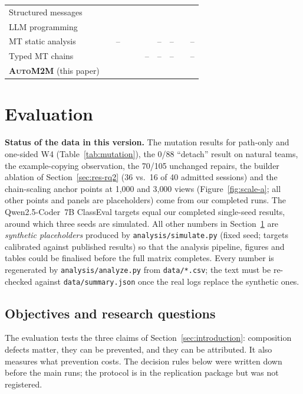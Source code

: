 \documentclass[pdflatex,sn-mathphys-num]{sn-jnl}
\theoremstyle{thmstyleone}%
\theoremstyle{thmstyletwo}%
\theoremstyle{thmstylethree}%
\newcommand{\auto}{\textsc{AutoM2M}}
\newcommand{\W}[1]{\textsf{W#1}}
\newcommand{\cmark}{\ding{51}}
\newcommand{\xmark}{\ding{55}}
\newcommand{\pmark}{\ding{109}}
\newcommand{\SyntheticNotice}{%
\begin{tcolorbox}[enhanced, breakable, colback=rawbg, colframe=rawbar, boxrule=0.6pt, arc=1pt,
  left=6pt, right=6pt, top=4pt, bottom=4pt]
\small\textbf{Status of the data in this version.} The mutation results for
path-only and one-sided \W{4} (Table~\ref{tab:mutation}), the 0/88 ``detach''
result on natural teams, the example-copying observation, the 70/105 unchanged
repairs, the builder ablation of Section~\ref{sec:res-rq2} (36 vs.\ 16 of 40 admitted sessions) and the chain-scaling anchor points at 1{,}000 and 3{,}000 views
(Figure~\ref{fig:scale-a}; all other points and panels are placeholders) come
from our completed runs. The Qwen2.5-Coder~7B ClassEval targets equal our completed
single-seed results, around which three seeds are simulated. All other numbers in
Section~\ref{sec:eval} are \emph{synthetic placeholders} produced by
\texttt{analysis/simulate.py} (fixed seed; targets calibrated against published
results) so that the analysis pipeline, figures and tables could be finalised
before the full matrix completes. Every number is regenerated by
\texttt{analysis/analyze.py} from \texttt{data/*.csv}; the text must be
re-checked against \texttt{data/summary.json} once the real logs replace the
synthetic ones.
\end{tcolorbox}}
\begin{document}
\begin{table}[t]
\begin{tabular}{@{}l c c c c c c c c c@{}}
Structured messages~\cite{khattab2024dspy,zhang2026patchboard} & \xmark & \cmark & \xmark & \pmark & \xmark & \xmark & \xmark & \pmark & \pmark \\
LLM programming~\cite{beurerkellner2023lmql,zheng2024sglang,khattab2024dspy} & \xmark & \cmark & \xmark & \pmark & \xmark & \xmark & \xmark & \xmark & \cmark \\
MT static analysis~\cite{cuadrado2017static,burgueno2015static} & \xmark & -- & \xmark & \cmark & \pmark & -- & -- & \pmark & -- \\
Typed MT chains~\cite{vanhooff2007uniti} & \xmark & \cmark & \xmark & \pmark & -- & -- & -- & \xmark & -- \\
\textbf{\auto{}} (this paper) & \cmark & \cmark & \pmark & \cmark & \cmark & \cmark & \pmark & \cmark & \xmark \\
\bottomrule
\end{tabular}
\end{table}

\section{Evaluation}\label{sec:eval}

\SyntheticNotice

\subsection{Objectives and research questions}\label{sec:rqs}

The evaluation tests the three claims of Section~\ref{sec:introduction}:
composition defects matter, they can be prevented, and they can be attributed.
It also measures what prevention costs. The decision rules below were written
down before the main runs; the protocol is in the replication package but was
not registered.
\end{document}
